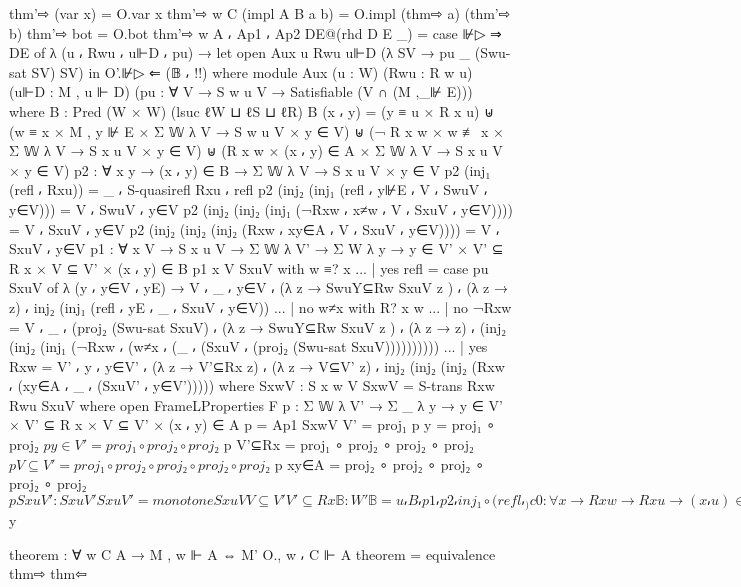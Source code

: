 \begin{spverbatim}
      thm'⇨ (var x) = O.var x
      thm'⇨ {w} {C} (impl {A} {B} a b) = O.impl (thm⇨ a) (thm'⇨ b)
      thm'⇨ bot = O.bot
      thm'⇨ {w} {A ⸴ Ap1 ⸴ Ap2} DE@(rhd {D} {E} _) = case ⊮▷ ⇒ DE of
        λ { (u ⸴ Rwu ⸴ u⊩D ⸴ pu) →
          let open Aux u Rwu u⊩D (λ {SV → pu _ (Swu-sat SV) SV})
          in O'.⊮▷ ⇐ (𝔹 ⸴ {!!})
        }
        where
        module Aux
          (u : W)
          (Rwu : R w u)
          (u⊩D : M , u ⊩ D)
          (pu : ∀ {V} → S w u V → Satisfiable (V ∩ (M ,_⊮ E)))
          where
          B : Pred (W × W) (lsuc ℓW ⊔ ℓS ⊔ ℓR)
          B (x ⸴ y) =
              (y ≡ u × R x u)
            ⊎ (w ≡ x × M , y ⊮ E × Σ 𝕎 λ V → S w u V × y ∈ V)
            ⊎ (¬ R x w × w ≢ x × Σ 𝕎 λ V → S x u V × y ∈ V)
            ⊎ (R x w × (x ⸴ y) ∈ A × Σ 𝕎 λ V → S x u V × y ∈ V)
          p2 : ∀ {x y} → (x ⸴ y) ∈ B → Σ 𝕎 λ V → S x u V × y ∈ V
          p2 (inj₁ (refl ⸴ Rxu)) = _ ⸴ S-quasirefl Rxu ⸴ refl
          p2 (inj₂ (inj₁ (refl ⸴ y⊮E ⸴ V ⸴ SwuV ⸴ y∈V))) = V ⸴ SwuV ⸴ y∈V
          p2 (inj₂ (inj₂ (inj₁ (¬Rxw ⸴ x≠w ⸴ V ⸴ SxuV ⸴ y∈V)))) = V ⸴ SxuV ⸴ y∈V
          p2 (inj₂ (inj₂ (inj₂ (Rxw ⸴ xy∈A ⸴ V ⸴ SxuV ⸴ y∈V)))) = V ⸴ SxuV ⸴ y∈V
          p1 : ∀ {x V} → S x u V → Σ 𝕎 λ V' → Σ W λ y
            → y ∈ V' × V' ⊆ R x × V ⊆ V' × (x ⸴ y) ∈ B
          p1 {x} {V} SxuV with w ≡? x
          ... | yes refl = case pu SxuV of
            λ { (y ⸴ y∈V ⸴ yE) → V ⸴ _ ⸴ y∈V ⸴ (λ {z → SwuY⊆Rw SxuV z }) ⸴ (λ {z → z})
            ⸴ inj₂ (inj₁ (refl ⸴ yE ⸴ _ ⸴ SxuV ⸴ y∈V))}
          ... | no w≠x with R? x w
          ... | no ¬Rxw = V ⸴ _ ⸴ (proj₂ (Swu-sat SxuV) ⸴ (λ {z → SwuY⊆Rw SxuV z })
            ⸴ (λ {z → z})
            ⸴ (inj₂ (inj₂ (inj₁ (¬Rxw ⸴ (w≠x ⸴ (_ ⸴ (SxuV ⸴ (proj₂ (Swu-sat SxuV))))))))))
          ... | yes Rxw = V' ⸴ y ⸴ y∈V' ⸴ (λ {z → V'⊆Rx z}) ⸴ (λ {z → V⊆V' z})
            ⸴ inj₂ (inj₂ (inj₂ (Rxw ⸴ (xy∈A ⸴ _ ⸴ (SxuV' ⸴ y∈V')))))
            where
            SxwV : S x w V
            SxwV = S-trans Rxw Rwu SxuV
              where open FrameLProperties F
            p : Σ 𝕎 λ V' → Σ _ λ y
              → y ∈ V' × V' ⊆ R x × V ⊆ V' × (x ⸴ y) ∈ A
            p = Ap1 SxwV
            V' = proj₁ p
            y = proj₁ ∘ proj₂ $ p
            y∈V' = proj₁ ∘ proj₂ ∘ proj₂ $ p
            V'⊆Rx = proj₁ ∘ proj₂ ∘ proj₂ ∘ proj₂ $ p
            V⊆V' = proj₁ ∘ proj₂ ∘ proj₂ ∘ proj₂ ∘ proj₂ $ p
            xy∈A = proj₂ ∘ proj₂ ∘ proj₂ ∘ proj₂ ∘ proj₂ $ p
            SxuV' : S x u V'
            SxuV' = monotone SxuV V⊆V' V'⊆Rx
          𝔹 : W'
          𝔹 = u ⸴ B
            ⸴ p1
            ⸴ p2
            ⸴ inj₁ ∘ (refl ⸴_)
          c0 : ∀ {x} → R x w → R x u → (x ⸴ u) ∈ A
          c0 Rxw Rxu = case Ap1 (R-Sw-trans Rxw Rwu) of
            λ { (V' ⸴ y ⸴ y∈V' ⸴ V'⊆Rx ⸴ u⊆V' ⸴ xy∈A) → {!!}}
          l1 : ∀ {x y} → R x w → (x ⸴ y) ∈ B → (x ⸴ y) ∈ A
          l1 Rxw (inj₁ (refl ⸴ Rxu)) = c0 Rxw Rxu
          l1 Rxw (inj₂ (inj₁ (refl ⸴ snd))) = ⊥-elim (R-Irreflexive {F = F} refl Rxw)
          l1 Rxw (inj₂ (inj₂ (inj₁ x))) = ⊥-elim (proj₁ x Rxw)
          l1 Rxw (inj₂ (inj₂ (inj₂ y))) = proj₁ ∘ proj₂ $ y

    theorem : ∀ {w C A} → M , w ⊩ A ⇔ M' O., w ⸴ C ⊩ A
    theorem = equivalence thm⇨ thm⇦
\end{spverbatim}

